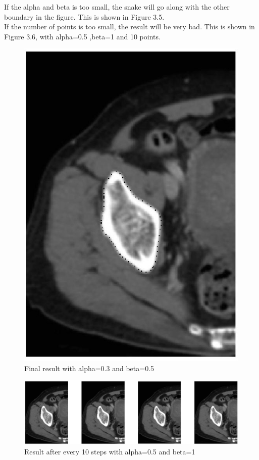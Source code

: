 \documentclass[paper=a4, fontsize=11pt]{scrartcl} %
\numberwithin{equation}{section} %
\numberwithin{figure}{section} %
\numberwithin{table}{subsection} %
\begin{document}
If the alpha and beta is too small, the snake will go along with the other boundary in the figure. This is shown in Figure 3.5.
\\

If the number of points is too small, the result will be very bad. 
This is shown in Figure 3.6, with alpha=0.5 ,beta=1 and 10 points.
\\

\begin{figure}[!htbp]
	\centering
	\includegraphics[width = 12cm]{p3_1.jpg}
	\caption{Final result with alpha=0.3 and beta=0.5}
\end{figure}


\begin{figure}[!htbp]
	\centering
	\includegraphics[width = 16cm]{p3_2.jpg}
	\caption{Result after every 10 steps with alpha=0.5 and beta=1}
\end{figure}
\end{document}
